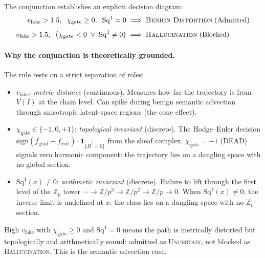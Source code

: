 \documentclass[11pt,a4paper]{article}
\begin{document}
The conjunction establishes an explicit decision diagram:
\begin{align*}
  v_{\text{fake}} > 1.5,\;\; \chi_{\text{gate}} \geq 0,\;\; \mathrm{Sq}^1 = 0
  &\;\Longrightarrow\; \textsc{Benign Distortion}\;\text{(Admitted)} \\[4pt]
  v_{\text{fake}} > 1.5,\;\; \bigl(\chi_{\text{gate}} < 0 \;\vee\; \mathrm{Sq}^1 \neq 0\bigr)
  &\;\Longrightarrow\; \textsc{Hallucination}\;\text{(Blocked)}
\end{align*}

\paragraph{Why the conjunction is theoretically grounded.}
The rule rests on a strict separation of roles:
\begin{itemize}
  \item $v_{\text{fake}}$: \emph{metric distance} (continuous).
        Measures how far the trajectory is from $V(I)$ at the chain level.
        Can spike during benign semantic advection through anisotropic
        latent-space regions (the cone effect).
  \item $\chi_{\text{gate}} \in \{-1,0,+1\}$: \emph{topological invariant} (discrete).
        The Hodge--Euler decision
        $\mathrm{sign}(f_{\mathrm{grad}} - f_{\mathrm{curl}})
        \cdot \mathbf{1}_{\{\check{H}^1 = 0\}}$
        from the sheaf complex.
        $\chi_{\text{gate}} = -1$ (DEAD) signals zero harmonic component:
        the trajectory lies on a dangling space with no global section.
  \item $\mathrm{Sq}^1(x) \neq 0$: \emph{arithmetic invariant} (discrete).
        Failure to lift through the first level of the $\mathbb{Z}_p$ tower
        $\cdots \to \mathbb{Z}/p^3 \to \mathbb{Z}/p^2 \to \mathbb{Z}/p \to 0$.
        When $\mathrm{Sq}^1(x) \neq 0$, the inverse limit is undefined at $x$:
        the class lies on a dangling space with no $\mathbb{Z}_p$-section.
\end{itemize}

High $v_{\text{fake}}$ with $\chi_{\text{gate}} \geq 0$ and $\mathrm{Sq}^1 = 0$
means the path is metrically distorted but topologically and arithmetically
sound: admitted as \textsc{Uncertain}, not blocked as \textsc{Hallucination}.
This is the semantic advection case.
\end{document}
